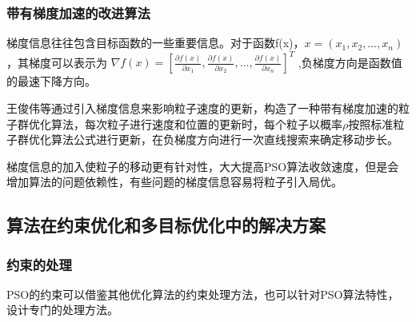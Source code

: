 \subsubsection{带有梯度加速的改进算法}
梯度信息往往包含目标函数的一些重要信息。对于函数f(x)，$x=(x_1,x_2,\ldots,x_n)$，其梯度可以表示为
$\nabla f(x)=[
\frac{\partial f(x)}{\partial x_1},
\frac{\partial f(x)}{\partial x_2},
\ldots,
\frac{\partial f(x)}{\partial x_n}]^T$
,负梯度方向是函数值的最速下降方向。

王俊伟等通过引入梯度信息来影响粒子速度的更新，构造了一种带有梯度加速的粒子群优化算法，每次粒子进行速度和位置的更新时，每个粒子以概率$\rho$按照标准粒子群优化算法公式进行更新，在负梯度方向进行一次直线搜索来确定移动步长。

梯度信息的加入使粒子的移动更有针对性，大大提高PSO算法收敛速度，但是会增加算法的问题依赖性，有些问题的梯度信息容易将粒子引入局优。

\subsection{算法在约束优化和多目标优化中的解决方案}
\subsubsection{约束的处理}
PSO的约束可以借鉴其他优化算法的约束处理方法，也可以针对PSO算法特性，设计专门的处理方法。

